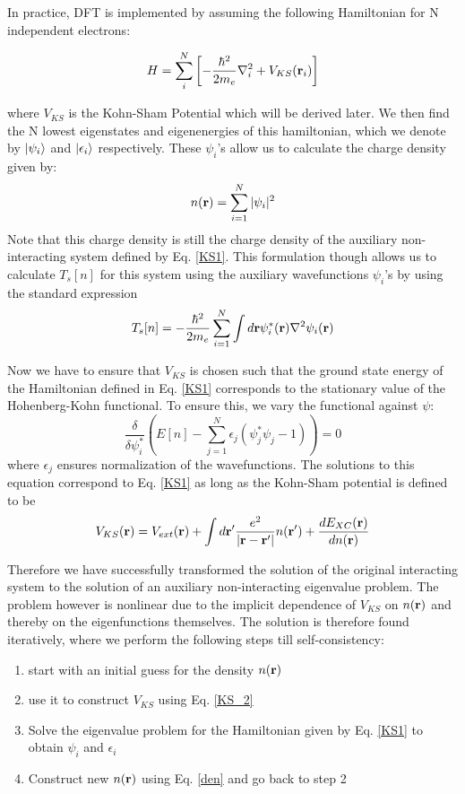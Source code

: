 \documentclass[10pt]{ruthesis}
\begin{document}
In practice, DFT is implemented by  assuming the following Hamiltonian for N independent electrons:

\begin{equation} \label{KS1}
H=\sum_{i}^{N} \left[ -\dfrac{\hbar^2}{2m_e}\nabla_i^2 +V_{KS}(\mathbf{r}_i)\right]
\end{equation}

 where $V_{KS}$ is the Kohn-Sham Potential which will be derived later. We then find the N lowest eigenstates and eigenenergies of this hamiltonian, which we denote by $|\psi_i\rangle$
 and $|\epsilon_i\rangle$ respectively. These $\psi_i$'s allow us to calculate the charge density given by:
 \begin{equation}\label{den}
 n(\mathbf{r})=\sum_{i=1}^{N} |\psi_i|^2
 \end{equation}
  Note that this charge density is still the charge density of the auxiliary non-interacting system defined by Eq. \ref{KS1}. This formulation though allows us to calculate $T_s[n]$ for this system using the auxiliary wavefunctions $\psi_i$'s by using the standard expression
 \begin{equation}
 T_s[n]=-\dfrac{\hbar^2}{2m_e} \sum_{i=1}^{N} \int d\mathbf{r} \psi^*_i(\mathbf{r}) \nabla^2 \psi_i(\mathbf{r})
 \end{equation}
 
 Now we have to ensure that $V_{KS}$ is chosen such that the ground state energy of the Hamiltonian defined in Eq. \ref{KS1} corresponds to the stationary value of the Hohenberg-Kohn functional. To ensure this, we vary the functional against  $\psi$:
 \begin{equation}
  \dfrac{\delta}{\delta \psi_i^*}\left( E[n] - \sum_{j=1}^{N} \epsilon_j (\psi^*_j \psi_j -1) \right)=0
  \end{equation} 
  where $\epsilon_j$ ensures normalization of the wavefunctions. The solutions to this equation correspond to Eq. \ref{KS1} as long as the Kohn-Sham potential is defined to be
 \begin{equation}\label{KS_2}
 V_{KS}(\mathbf{r})=V_{ext}(\mathbf{r}) + \int d\mathbf{r}' \dfrac{e^2}{|\mathbf{r} -\mathbf{r}'|} n(\mathbf{r}') + \dfrac{d E_{XC}(\mathbf{r})}{dn(\mathbf{r})}
 \end{equation}

Therefore we have successfully transformed the solution of the original interacting system to the solution of an auxiliary non-interacting eigenvalue problem. The problem however is nonlinear due to the implicit dependence of $V_{KS}$ on $n(\mathbf{r})$ and thereby on the eigenfunctions themselves. The solution is therefore found iteratively, where we perform the following steps till self-consistency:
\begin{enumerate}
\item start with an initial guess for the density $n(\mathbf{r})$
\item use it to construct $V_{KS}$ using Eq. \ref{KS_2}
\item Solve the eigenvalue problem for the Hamiltonian given by Eq. \ref{KS1} to obtain $\psi_i$ and $\epsilon_i$ 
\item Construct new $n(\mathbf{r})$ using Eq. \ref{den} and go back to step 2
\end{enumerate}
\end{document}
